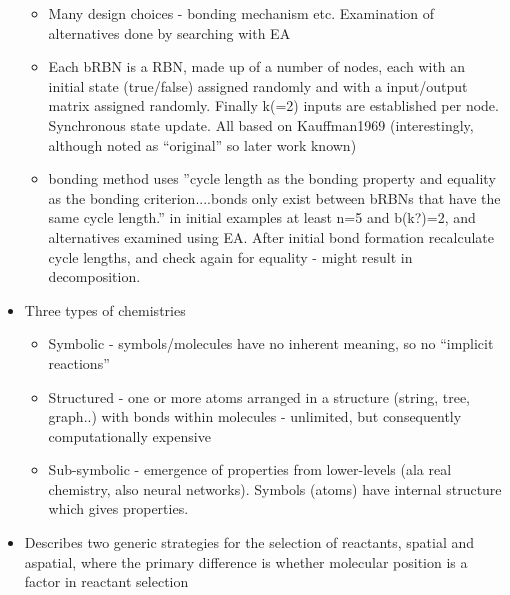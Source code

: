 \begin{itemize}
\begin{itemize}
				\item
				
				Many design choices - bonding mechanism etc. Examination of
				alternatives done by searching with EA
				
				\item
				
				Each bRBN is a RBN, made up of a number of nodes, each with an
				initial state (true/false) assigned randomly and with a input/output
				matrix assigned randomly. Finally k(=2) inputs are established per
				node. Synchronous state update. All based on Kauffman1969
				(interestingly, although noted as ``original'' so later work known)
				
				\item
				
				bonding method uses ''cycle length as the bonding property and
				equality as the bonding criterion....bonds only exist between bRBNs
				that have the same cycle length.'' in initial examples at least n=5
				and b(k?)=2, and alternatives examined using EA. After initial bond
				formation recalculate cycle lengths, and check again for equality -
				might result in decomposition.
				
			\end{itemize}
			\item
			
			Three types of chemistries
			
			
			\begin{itemize}
				\item
				
				Symbolic - symbols/molecules have no inherent meaning, so no
				``implicit reactions''
				
				\item
				
				Structured - one or more atoms arranged in a structure (string,
				tree, graph..) with bonds within molecules - unlimited, but
				consequently computationally expensive
				
				\item
				
				Sub-symbolic - emergence of properties from lower-levels (ala real
				chemistry, also neural networks). Symbols (atoms) have internal
				structure which gives properties.
				
			\end{itemize}
			\item
			
			Describes two generic strategies for the selection of reactants,
			spatial and aspatial, where the primary difference is whether
			molecular position is a factor in reactant selection
			

\end{itemize}

